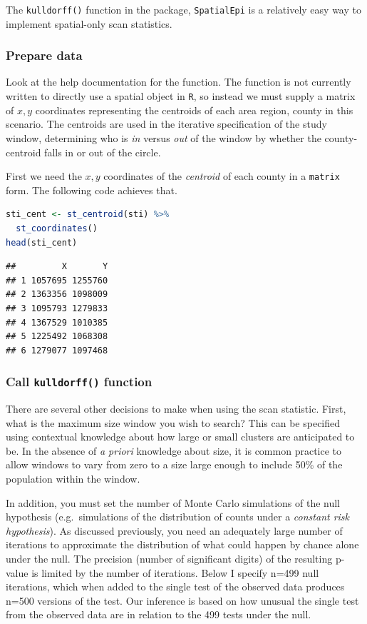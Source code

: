 \documentclass[
]{book}
\newcommand{\passthrough}[1]{#1}
\begin{document}
The \passthrough{\lstinline!kulldorff()!} function in the package, \passthrough{\lstinline!SpatialEpi!} is a relatively easy way to implement spatial-only scan statistics.

\hypertarget{prepare-data}{%
\subsubsection{Prepare data}\label{prepare-data}}

Look at the help documentation for the function. The function is not currently written to directly use a spatial object in \passthrough{\lstinline!R!}, so instead we must supply a matrix of \(x,y\) coordinates representing the centroids of each area region, county in this scenario. The centroids are used in the iterative specification of the study window, determining who is \emph{in} versus \emph{out} of the window by whether the county-centroid falls in or out of the circle.

First we need the \(x,y\) coordinates of the \emph{centroid} of each county in a \passthrough{\lstinline!matrix!} form. The following code achieves that.

\begin{lstlisting}[language=R]
sti_cent <- st_centroid(sti) %>%
  st_coordinates()
head(sti_cent)
\end{lstlisting}

\begin{lstlisting}
##         X       Y
## 1 1057695 1255760
## 2 1363356 1098009
## 3 1095793 1279833
## 4 1367529 1010385
## 5 1225492 1068308
## 6 1279077 1097468
\end{lstlisting}

\hypertarget{call-kulldorff-function}{%
\subsubsection{\texorpdfstring{Call \texttt{kulldorff()} function}{Call kulldorff() function}}\label{call-kulldorff-function}}

There are several other decisions to make when using the scan statistic. First, what is the maximum size window you wish to search? This can be specified using contextual knowledge about how large or small clusters are anticipated to be. In the absence of \emph{a priori} knowledge about size, it is common practice to allow windows to vary from zero to a size large enough to include 50\% of the population within the window.

In addition, you must set the number of Monte Carlo simulations of the null hypothesis (e.g.~simulations of the distribution of counts under a \emph{constant risk hypothesis}). As discussed previously, you need an adequately large number of iterations to approximate the distribution of what could happen by chance alone under the null. The precision (number of significant digits) of the resulting p-value is limited by the number of iterations. Below I specify n=499 null iterations, which when added to the single test of the observed data produces n=500 versions of the test. Our inference is based on how unusual the single test from the observed data are in relation to the 499 tests under the null.
\end{document}
